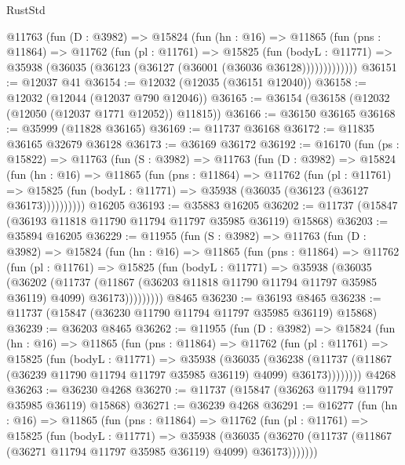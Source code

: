 \begin{lexlean}{RustStd}
\begin{coremodule}
        @11763
          (fun (D : @3982) =>
          @15824
            (fun (hn : @16) =>
            @11865
              (fun (pns : @11864) =>
              @11762
                (fun (pl : @11761) =>
                @15825
                  (fun (bodyL : @11771) =>
                  @35938 (@36035 (@36123 (@36127 (@36001 (@36036 @36128)))))))))))))
@36151 := @12037 @41
@36154 := @12032 (@12035 (@36151 @12040))
@36158 := @12032 (@12044 (@12037 @790 @12046))
@36165 := @36154 (@36158 (@12032 (@12050 (@12037 @1771 @12052)) @11815))
@36166 := @36150 @36165
@36168 := @35999 (@11828 @36165)
@36169 := @11737 @36168
@36172 := @11835 @36165 @32679 @36128
@36173 := @36169 @36172
@36192 := @16170
    (fun (ps : @15822) =>
    @11763
      (fun (S : @3982) =>
      @11763
        (fun (D : @3982) =>
        @15824
          (fun (hn : @16) =>
          @11865
            (fun (pns : @11864) =>
            @11762
              (fun (pl : @11761) =>
              @15825 (fun (bodyL : @11771) => @35938 (@36035 (@36123 (@36127 @36173))))))))))
    @16205
@36193 := @35883 @16205
@36202 := @11737 (@15847 (@36193 @11818 @11790 @11794 @11797 @35985 @36119) @15868)
@36203 := @35894 @16205
@36229 := @11955
    (fun (S : @3982) =>
    @11763
      (fun (D : @3982) =>
      @15824
        (fun (hn : @16) =>
        @11865
          (fun (pns : @11864) =>
          @11762
            (fun (pl : @11761) =>
            @15825
              (fun (bodyL : @11771) =>
              @35938
                (@36035
                  (@36202
                    (@11737
                      (@11867 (@36203 @11818 @11790 @11794 @11797 @35985 @36119) @4099)
                      @36173)))))))))
    @8465
@36230 := @36193 @8465
@36238 := @11737 (@15847 (@36230 @11790 @11794 @11797 @35985 @36119) @15868)
@36239 := @36203 @8465
@36262 := @11955
    (fun (D : @3982) =>
    @15824
      (fun (hn : @16) =>
      @11865
        (fun (pns : @11864) =>
        @11762
          (fun (pl : @11761) =>
          @15825
            (fun (bodyL : @11771) =>
            @35938
              (@36035
                (@36238
                  (@11737 (@11867 (@36239 @11790 @11794 @11797 @35985 @36119) @4099) @36173))))))))
    @4268
@36263 := @36230 @4268
@36270 := @11737 (@15847 (@36263 @11794 @11797 @35985 @36119) @15868)
@36271 := @36239 @4268
@36291 := @16277
    (fun (hn : @16) =>
    @11865
      (fun (pns : @11864) =>
      @11762
        (fun (pl : @11761) =>
        @15825
          (fun (bodyL : @11771) =>
          @35938
            (@36035
              (@36270 (@11737 (@11867 (@36271 @11794 @11797 @35985 @36119) @4099) @36173)))))))

\end{coremodule}
\end{lexlean}
